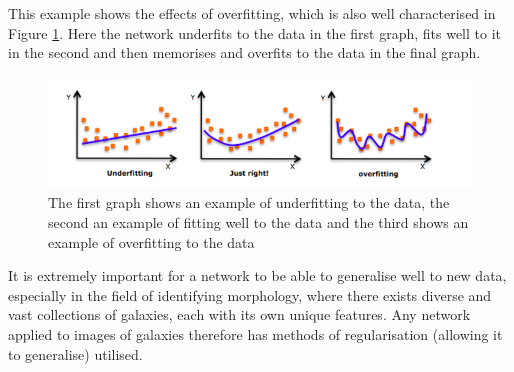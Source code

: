 \documentclass[12pt, onecolumn]{aa}
\begin{document}
This example shows the effects of overfitting, which is also well characterised in Figure \ref{fig:regular}. Here the network underfits to the data in the first graph, fits well to it in the second and then memorises and overfits to the data in the final graph. 

\begin{figure}[h]
    \centering
    \includegraphics[width=\linewidth]{Figures/regularisation.png}
    \caption{The first graph shows an example of underfitting to the data, the second an example of fitting well to the data and the third shows an example of overfitting to the data \citep{shubham_2018}}
    \label{fig:regular}
\end{figure}

It is extremely important for a network to be able to generalise well to new data, especially in the field of identifying morphology, where there exists diverse and vast collections of galaxies, each with its own unique features. Any network applied to images of galaxies therefore has methods of regularisation (allowing it to generalise) utilised.\\
\end{document}
